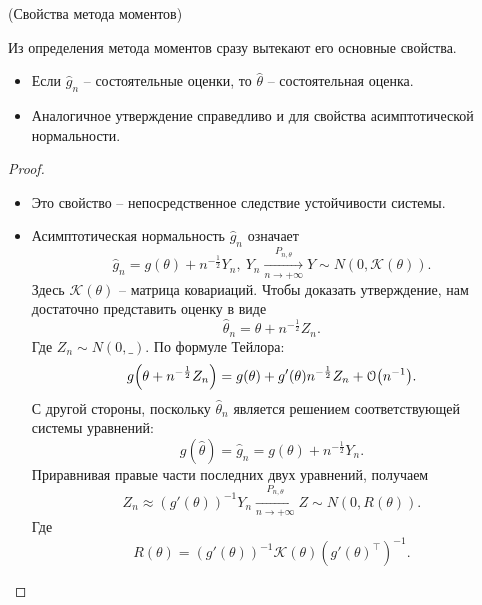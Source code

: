 \begin{theorem}(Свойства метода моментов)

    Из определения метода моментов сразу вытекают его основные свойства.
    \begin{itemize}
        \item Если $\hat{g}_n$ -- состоятельные оценки, то $\hat{\theta}$
            -- состоятельная оценка.
        \item Аналогичное утверждение справедливо и для свойства
            асимптотической нормальности.
    \end{itemize}
\end{theorem}
\begin{proof}
    \enewline
    \begin{itemize}
        \item Это свойство -- непосредственное следствие устойчивости системы.
        \item Асимптотическая нормальность $\hat{g}_n$ означает
            \[
                \hat{g}_n = g(\theta) + n^{-\frac{1}{2}} Y_n,~
                Y_n \xrightarrow[n \to +\infty]{P_{n, \theta}} Y \sim
                N(0, \mathcal{K}(\theta))
            .\]
            Здесь $\mathcal{K}(\theta)$ -- матрица ковариаций. Чтобы доказать
            утверждение, нам достаточно представить оценку в виде
            \[
                \hat{\theta}_n = \theta + n^{-\frac{1}{2}} Z_n
            .\]
            Где $Z_n \sim N(0, \_)$. По формуле Тейлора:
            \[
                g\parens*{\theta + n^{-\frac{1}{2}} Z_n} =
                g(\theta) + g'(\theta) n^{-\frac{1}{2}} Z_n + \cO\parens*{n^{-1}}
            .\]
            С другой стороны, поскольку $\hat{\theta}_n$ является решением
            соответствующей системы уравнений:
            \[
                g(\hat{\theta}) = \hat{g}_n = g(\theta) + n^{-\frac{1}{2}} Y_n
            .\]
            Приравнивая правые части последних двух уравнений, получаем
            \[
                Z_n \approx (g'(\theta))^{-1} Y_n \xrightarrow[n \to +\infty]
                {P_{n, \theta}} Z \sim N(0, R(\theta))
            .\]
            Где
            \[
                R(\theta) = (g'(\theta))^{-1} \mathcal{K}(\theta)
                (g'(\theta)^\top)^{-1}
            .\]
    \end{itemize}
\end{proof}

